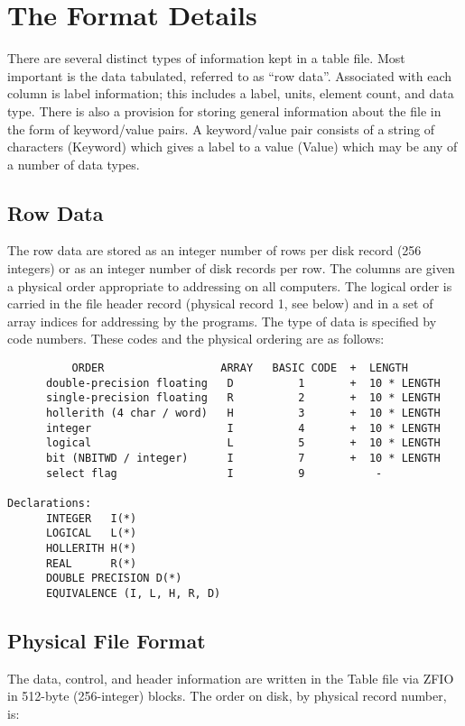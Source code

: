 \section{The Format Details }
There are several distinct types of information kept in a table file.
Most important is the data tabulated, referred to as ``row data''.
Associated with each column is label information; this includes a
label, units, element count, and data type.  There is
also a provision for storing general information about the file in the
form of keyword/value pairs.  A keyword/value pair consists of a
string of characters (Keyword) which gives a label to a value (Value)
which may be any of a number of data types.

\subsection{Row Data }
The row data are stored as an integer number of rows per disk record
(256 integers) or as an integer number of disk records per row.  The
columns are given a physical order appropriate to addressing on all
computers.  The logical order is carried in the file header record
(physical record 1, see below) and in a set of array indices for
addressing by the programs.  The type of data is specified by code
numbers.  These codes and the physical ordering are as follows:

\begin{verbatim}
          ORDER                  ARRAY   BASIC CODE  +  LENGTH
      double-precision floating   D          1       +  10 * LENGTH
      single-precision floating   R          2       +  10 * LENGTH
      hollerith (4 char / word)   H          3       +  10 * LENGTH
      integer                     I          4       +  10 * LENGTH
      logical                     L          5       +  10 * LENGTH
      bit (NBITWD / integer)      I          7       +  10 * LENGTH
      select flag                 I          9           -

Declarations:
      INTEGER   I(*)
      LOGICAL   L(*)
      HOLLERITH H(*)
      REAL      R(*)
      DOUBLE PRECISION D(*)
      EQUIVALENCE (I, L, H, R, D)

\end{verbatim}

\subsection{Physical File Format }
     The data, control, and header information are written in the
Table file via ZFIO in 512-byte (256-integer) blocks.  The order on
disk, by physical record number, is:

